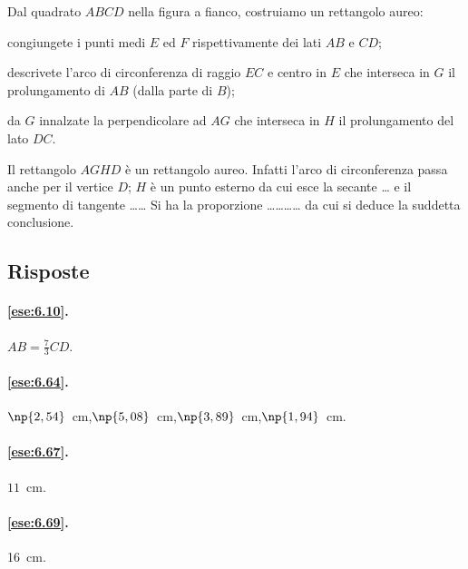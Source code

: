 \noindent\begin{minipage}{0.7\textwidth}\parindent15pt
\begin{esercizio}
\label{ese:6.112}
Dal quadrato $ABCD$ nella figura a fianco, costruiamo un rettangolo aureo:
\begin{enumerate*}
\item congiungete i punti medi $E$ ed $F$ rispettivamente dei lati $AB$ e $CD$;
\item descrivete l'arco di circonferenza di raggio $EC$ e centro in $E$ che interseca in $G$ il prolungamento di $AB$ (dalla parte di $B$);
\item da $G$ innalzate la perpendicolare ad $AG$ che interseca in $H$ il prolungamento del lato $DC$.
\end{enumerate*}
Il rettangolo $AGHD$ è un rettangolo aureo. Infatti l'arco di circonferenza passa anche per il vertice $D$; $H$ è un punto esterno da cui esce la secante \ldots{} e il segmento di tangente \ldots\ldots{}
Si ha la proporzione \ldots\ldots\ldots\ldots{} da cui si deduce la suddetta conclusione.
\end{esercizio}
\end{minipage}\hfil
\begin{minipage}{0.3\textwidth}
	\centering
\end{minipage}


\subsection{Risposte}

\begingroup
\hypersetup{linkcolor=black}

\paragraph{\ref{ese:6.10}.}
$AB=\frac{7}{3}CD$.

\paragraph{\ref{ese:6.64}.}
$\np{2,54}$~cm,\quad $\np{5,08}$~cm,\quad $\np{3,89}$~cm,\quad $\np{1,94}$~cm.

\paragraph{\ref{ese:6.67}.}
$11$~cm.

\paragraph{\ref{ese:6.69}.}
16~cm.


